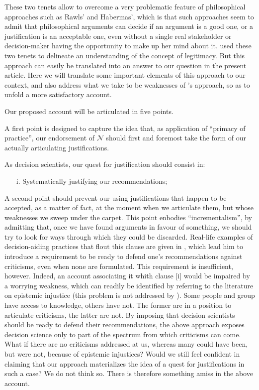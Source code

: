 \documentclass[preprint, french, english, 11pt, authoryear]{elsarticle}%
\newcommand{\adv}{\mathscr{N}}
\begin{document}
These two tenets allow to overcome a very problematic feature of philosophical approaches such as Rawls' and Habermas', which is that such approaches seem to admit that philosophical arguments can decide if an argument is a good one, or a justification is an acceptable one, even without a single real stakeholder or decision-maker having the opportunity to make up her mind about it. \citet{meinard_what_2017} used these two tenets to delineate an understanding of the concept of legitimacy. But this approach can easily be translated into an answer to our question in the present article. Here we will translate some important elements of this approach to our context, and also address what we take to be weaknesses of \cite{meinard_what_2017}'s approach, so as to unfold a more satisfactory account.

Our proposed account will be articulated in five points.

A first point is designed to capture the idea that, as application of ``primacy of practice'', our endorsement of $\adv$ should first and foremost take the form of our actually articulating justifications.

As decision scientists, our quest for justification should consist in:
\begin{itemize}
\item[i.]	Systematically justifying our recommendations;
\end{itemize}

A second point should prevent our using justifications that happen to be accepted, as a matter of fact, at the moment when we articulate them, but whose weaknesses we sweep under the carpet. This point enbodies ``incrementalism'', by admitting that, once we have found arguments in favour of something, we should try to look for ways through which they could be discarded. Real-life examples of decision-aiding practices that flout this clause are given in \cite{meinard_what_2017}, which lead him to introduce a requirement to be ready to defend one's recommendations against criticisms, even when none are formulated. This requirement is insufficient, however. Indeed, an account associating it whith clause [i] would be impaired by a worrying weakness, which can readily be identified by referring to the literature on epistemic injustice \cite{fricker_epistemic_2007} (this problem is not addressed by \cite{meinard_what_2017}). Some people and group have access to knowledge, others have not. The former are in a position to articulate criticisms, the latter are not. By imposing that decision scientists should be ready to defend their recommendations, the above approach exposes decision science only to part of the spectrum from which criticisms can come. What if there are no criticisms addressed at us, whereas many could have been, but were not, because of epistemic injustices? Would we still feel confident in claiming that our approach materializes the idea of a quest for justifications in such a case? We do not think so. There is therefore something amiss in the above account.
\end{document}
